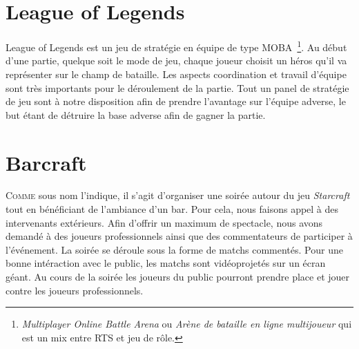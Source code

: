 
\section{League of Legends}%
\label{sec:league_of_legends}

League of Legends est un jeu de stratégie en équipe de type MOBA\,
\footnote{\emph{Multiplayer Online Battle Arena} ou \emph{Arène de
bataille en ligne multijoueur} qui est un mix entre RTS et jeu de
rôle.}. Au début d'une partie, quelque soit le mode de jeu, chaque
joueur choisit un héros qu'il va représenter sur le champ de bataille.
Les aspects coordination et travail d'équipe sont très importants pour
le déroulement de la partie. Tout un panel de stratégie de jeu sont à
notre disposition afin de prendre l'avantage sur l'équipe adverse, le
but étant de détruire la base adverse afin de gagner la partie.

\section{Barcraft}%
\label{sec:barcraft}

\lettrine{C}{omme} sous nom l'indique, il s'agit d'organiser une soirée
autour du jeu \emph{Starcraft} tout en bénéficiant de l'ambiance d'un bar. Pour cela, nous
faisons appel à des intervenants extérieurs. Afin d'offrir un maximum
de spectacle, nous avons demandé à des joueurs professionnels ainsi que
des commentateurs de participer à l'événement. La soirée
se déroule sous la forme de matchs commentés. Pour une bonne intéraction
avec le public, les matchs sont vidéoprojetés sur un écran géant. Au
cours de la soirée les joueurs du public pourront prendre place et jouer
contre les joueurs professionnels.

